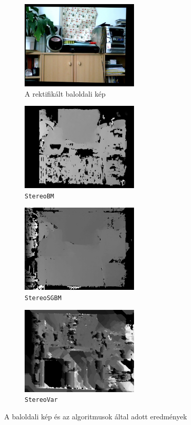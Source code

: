 \documentclass[a4paper,oneside]{article}
\begin{document}
\begin{figure}[tbh]
  \centering
  \begin{subfigure}[b]{.5\linewidth}
	\centering
	\includegraphics[width=160pt]{figs/left01_mapped.jpg}
	\caption{A rektifikált baloldali kép}
  \end{subfigure}%
  \begin{subfigure}[b]{.5\linewidth}
	\centering
    \includegraphics[width=160pt]{figs/disparity_bm.jpg}
	\caption{\texttt{StereoBM}}
  \end{subfigure}
  \begin{subfigure}[b]{.5\linewidth}
	\centering
	\includegraphics[width=160pt]{figs/disparity_sgbm.jpg}
	\caption{\texttt{StereoSGBM}}
  \end{subfigure}%
  \begin{subfigure}[b]{.5\linewidth}
	\centering
    \includegraphics[width=160pt]{figs/disparity_var.jpg}
	\caption{\texttt{StereoVar}}
  \end{subfigure}
\caption{A baloldali kép és az algoritmusok által adott eredmények \label{fig:disparities}}
\end{figure}
\end{document}
